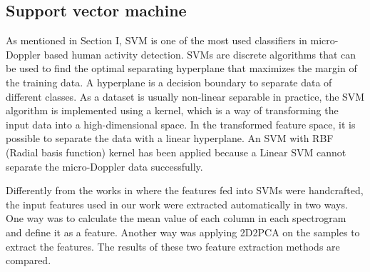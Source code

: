 \subsection{Support vector machine}
As mentioned in Section I, SVM is one of the most used classifiers in micro-Doppler based human activity detection. SVMs are discrete algorithms that can be used to find the optimal separating hyperplane that maximizes the margin of the training data. A hyperplane is a decision boundary to separate data of different classes. As a dataset is usually non-linear separable in practice, the SVM algorithm is implemented using a kernel, which is a way of transforming the input data into a high-dimensional space. In the transformed feature space, it is possible to separate the data with a linear hyperplane.  An SVM with RBF (Radial basis function) kernel has been applied because a Linear SVM cannot separate the micro-Doppler data successfully.   

Differently from the works in \cite{narayanan2015radar,ccaugliyan2015micro,kim2009human,zenaldin2016radar} where the features fed into SVMs were handcrafted, the input features used in our work were extracted automatically in two ways. One way was to calculate the mean value of each column in each spectrogram and define it as a feature. Another way was applying 2D2PCA on the samples to extract the features. The results of these two feature extraction methods are compared.

